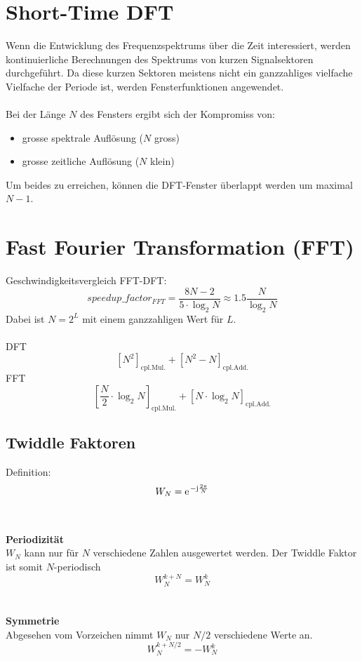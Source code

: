 \section{Short-Time DFT}
Wenn die Entwicklung des Frequenzspektrums über die Zeit interessiert, werden
kontinuierliche Berechnungen des Spektrums von kurzen Signalsektoren 
durchgeführt. Da diese kurzen Sektoren meistens nicht ein ganzzahliges
vielfache Vielfache der Periode ist, werden Fensterfunktionen angewendet.\\
\\
Bei der Länge $N$ des Fensters ergibt sich der Kompromiss von:
\begin{itemize}
	\item grosse spektrale Auflösung ($N$ gross)
	\item grosse zeitliche Auflösung ($N$ klein)
\end{itemize}

Um beides zu erreichen, können die DFT-Fenster überlappt werden um maximal
$N-1$.

\section{Fast Fourier Transformation (FFT)}
Geschwindigkeitsvergleich FFT-DFT:
\[ speedup\_factor_{FFT} = \frac{8N-2}{5\cdot \log_2N} \approx 1.5 	
	\frac{N}{\log_2N} \]
Dabei ist $N = 2^L$ mit einem ganzzahligen Wert für $L$.\\
\\
DFT
\[ \left[N^2\right]_\textrm{cpl.Mul.} + \left[N^2-N\right]_\textrm{cpl.Add.} \]
FFT
\[ \left[\frac{N}{2}\cdot\log_2N\right]_\textrm{cpl.Mul.} + 
	\left[N\cdot\log_2N\right]_\textrm{cpl.Add.} \]
	
\subsection{Twiddle Faktoren}
Definition:
\[ W_N = \e^{-\im\frac{2\pi}{N}} \]\\
\\
\textbf{Periodizität}\\
$W_N$ kann nur für $N$ verschiedene Zahlen ausgewertet werden. Der Twiddle
Faktor ist somit $N$-periodisch
\[ W_N^{k+N} = W_N^k \]\\
\\
\textbf{Symmetrie}\\
Abgesehen vom Vorzeichen nimmt $W_N$ nur $N/2$ verschiedene Werte an.
\[ W_N^{k+N/2} = -W_N^k \]

